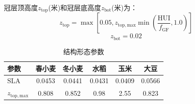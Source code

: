 冠层顶高度$z_{\mathrm{top}}$(米)和冠层底高度$z_{\mathrm{bot}}$(米)为：
\begin{equation}
z_{\mathrm{top}}=\max \left[0.05, z_{\mathrm{top,max}} \min \left(\frac{{\mathrm {HUI}}}{f_{\mathrm{GF}}}, 1.0\right)\right]
\end{equation}
\begin{equation}
z_{\mathrm{b o t}}=0.02
\end{equation}

\begin{table}[htbp]
  \centering
  \caption{结构形态参数}
  \label{tab:结构形态参数}
  \begin{tabular}{@{}lccccc}
  \toprule
  参数   & 春小麦  & 冬小麦 & 水稻    & 玉米   & 大豆    \\ \midrule
  ${\mathrm {SLA}}$  & 0.0453 & 0.0441 & 0.0431 & 0.0409 & 0.0566 \\
  $z_{\mathrm{top,max}}$ & 0.808 & 0.852 & 0.98 & 2.55 & 0.823     \\ \bottomrule
  \end{tabular}
\end{table}
